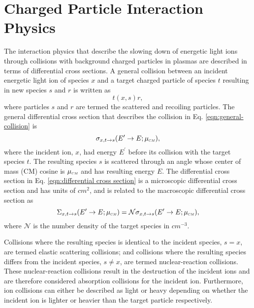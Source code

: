 \documentclass[../main.tex]{subfiles}
\begin{document}
\chapter{Charged Particle Interaction Physics}
The interaction physics that describe the slowing down of energetic light ions through collisions with background charged particles in plasmas are described in terms of differential cross sections. A general collision between an incident energetic light ion of species $x$ and a target charged particle of species $t$ resulting in new species $s$ and $r$ is written as
\begin{equation} \label{eqn:general-collision}
    t(x,s)r,
\end{equation}
where particles $s$ and $r$ are termed the scattered and recoiling particles. The general differential cross section that describes the collision in Eq. \eqref{eqn:general-collision} is
\begin{equation} \label{eqn:differential cross section}
    \sigma_{x,t \rightarrow s}(E^{\prime} \rightarrow E; \mucm),
\end{equation}
where the incident ion, $x$, had energy $E^{\prime}$ before its collision with the target species $t$. The resulting species $s$ is scattered through an angle whose center of mass (CM) cosine is $\mucm$ and has resulting energy $E$. The differential cross section in Eq. \eqref{eqn:differential cross section} is a microscopic differential cross section and has units of $cm^{2}$, and is related to the macroscopic differential cross section as
\begin{equation}
    \Sigma_{x,t \rightarrow s}(E^{\prime} \rightarrow E; \mucm) = \mathcal{N} \sigma_{x,t \rightarrow s}(E^{\prime} \rightarrow E; \mucm),
\end{equation}
where $\mathcal{N}$ is the number density of the target species in $cm^{-3}$.

Collisions where the resulting species is identical to the incident species, $s = x$, are termed elastic scattering collisions; and collisions where the resulting species differs from the incident species, $s \neq x$, are termed nuclear-reaction collisions. These nuclear-reaction collisions result in the destruction of the incident ions and are therefore considered absorption collisions for the incident ion. Furthermore, ion collisions can either be described as light or heavy depending on whether the incident ion is lighter or heavier than the target particle respectively. 
\end{document}
